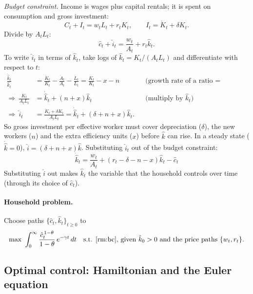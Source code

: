 \emph{Budget constraint.} Income is wages plus capital rentals; it is spent on consumption and gross investment:
\[
C_t+I_t=w_tL_t+r_tK_t,\qquad I_t=\dot K_t+\delta K_t .
\]
Divide by $A_tL_t$:
\[
\hat c_t+\hat i_t=\frac{w_t}{A_t}+r_t\hat k_t .
\]
To write $\hat i_t$ in terms of $\hat k_t$, take logs of $\hat k_t=K_t/(A_tL_t)$ and differentiate with respect to $t$:
\begin{align*}
\frac{\dot{\hat k}_t}{\hat k_t}&=\frac{\dot K_t}{K_t}-\frac{\dot A_t}{A_t}-\frac{\dot L_t}{L_t}=\frac{\dot K_t}{K_t}-x-n
&&\text{(growth rate of a ratio = difference of growth rates)}\\
\Rightarrow\ \frac{\dot K_t}{A_tL_t}&=\dot{\hat k}_t+(n+x)\hat k_t
&&\text{(multiply by $\hat k_t$)}\\
\Rightarrow\ \hat i_t&=\frac{\dot K_t+\delta K_t}{A_tL_t}=\dot{\hat k}_t+(\delta+n+x)\hat k_t .
\end{align*}
So gross investment per effective worker must cover depreciation ($\delta$), the new workers ($n$) and the extra efficiency units ($x$) before $\hat k$ can rise. In a steady state ($\dot{\hat k}=0$), $\hat i=(\delta+n+x)\hat k$. Substituting $\hat i_t$ out of the budget constraint:
\begin{equation}
\boxed{\ \dot{\hat k}_t=\frac{w_t}{A_t}+(r_t-\delta-n-x)\hat k_t-\hat c_t\ } \label{rm:bc}
\end{equation}
Substituting $\hat i$ out makes $\hat k_t$ the variable that the household controls over time (through its choice of $\hat c_t$).

\paragraph{Household problem.} Choose paths $\{\hat c_t,\hat k_t\}_{t\ge0}$ to
\[
\max\ \int_0^\infty \frac{\hat c_t^{\,1-\theta}}{1-\theta}\,e^{-\gamma t}\,dt
\quad\text{s.t. \eqref{rm:bc}, given } \hat k_0>0 \text{ and the price paths } \{w_t,r_t\}.
\]

\subsection{Optimal control: Hamiltonian and the Euler equation }

